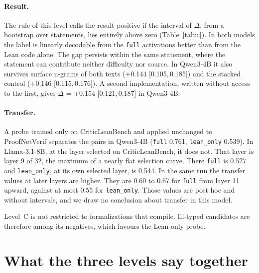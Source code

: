 \documentclass[10pt]{article}
\newcommand{\vr}[1]{\texttt{#1}}
\newcommand{\D}{\Delta}
\newcommand{\ic}[2]{[#1,\,#2]}
\begin{document}
\paragraph{Result.}
The rule of this level calls the result positive if the interval of $\D$, from a bootstrap over statements, lies entirely above zero (Table~\ref{tab:c}). In both models the label is linearly decodable from the \vr{full} activations better than from the Lean code alone. The
gap persists within the same statement, where the statement can contribute neither difficulty nor source. In
Qwen3-4B it also survives surface n-grams of both texts (+0.144 \ic{0.105}{0.185}) and the stacked control
(+0.146 \ic{0.115}{0.176}). A second implementation, written without access to the first, gives $\D$ = +0.154 \ic{0.121}{0.187} in Qwen3-4B.

\paragraph{Transfer.}
A probe trained only on CriticLeanBench and applied unchanged to ProofNetVerif separates the pairs in Qwen3-4B
(\vr{full} 0.761, \vr{lean\_only} 0.539). In Llama-3.1-8B, at the layer selected on CriticLeanBench, it does not.
That layer is layer 9 of 32, the maximum of a nearly flat selection curve. There \vr{full} is 0.527 and
\vr{lean\_only}, at its own selected layer, is 0.544. In the same run the transfer values at later layers are
higher. They are 0.60 to 0.67 for \vr{full} from layer 11 upward, against at most 0.55 for \vr{lean\_only}. Those
values are post hoc and without intervals, and we draw no conclusion about transfer in this model.

Level~C is not restricted to formalizations that compile. Ill-typed candidates are therefore among its negatives,
which favours the Lean-only probe.

\section{What the three levels say together}\label{sec:conjunta}
\end{document}
